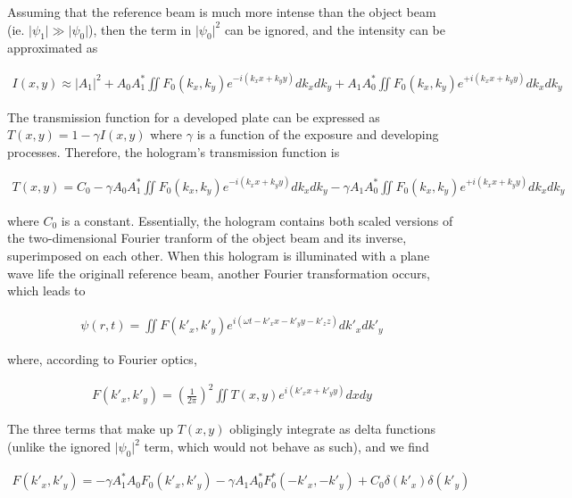 \documentclass[12pt]{article}
\begin{document}
Assuming that the reference beam is much more intense than the object beam (ie. $\lvert \psi_1 \rvert \gg \lvert \psi_0 \rvert$), then the term in $\lvert \psi_0 \rvert^2$ can be ignored,
and the intensity can be approximated as

\vspace{-2ex}
\begin{gather*}
    I (x,y) \approx \lvert A_1 \rvert^2 + A_0 A_1^* \iint F_0 (k_x,k_y) e^{-i(k_xx + k_yy)} dk_x dk_y + A_1 A_0^* \iint F_0 (k_x,k_y) e^{+i(k_xx + k_yy)} dk_x dk_y
\end{gather*}

The transmission function for a developed plate can be expressed as $T(x,y) = 1 - \gamma I(x,y)$ where $\gamma$ is a function of the exposure and
developing processes. Therefore, the hologram's transmission function is

\vspace{-2ex}
\begin{gather*}
    T(x,y) = C_0 - \gamma A_0A_1^* \iint F_0 (k_x,k_y) e^{-i(k_xx+k_yy)} dk_x dk_y - \gamma A_1 A_0^* \iint F_0 (k_x,k_y) e^{+i(k_xx +k_yy)} dk_x dk_y
\end{gather*}

where $C_0$ is a constant. Essentially, the hologram contains both scaled versions of the two-dimensional Fourier tranform of the object beam and its inverse, superimposed on each other.
When this hologram is illuminated with a plane wave life the originall reference beam, another Fourier transformation occurs, which leads to

\vspace{-2ex}
\begin{gather*}
    \psi (r,t) = \iint F(k'_x,k'_y) e^{i(\omega t - k'_xx - k'_yy - k'_zz)} dk'_x dk'_y
\end{gather*}

where, according to Fourier optics,

\vspace{-2ex}
\begin{gather*}
    F(k'_x,k'_y) = \left( \frac{1}{2 \pi} \right)^2 \iint T(x,y) e^{i(k'_xx + k'_yy)} dxdy
\end{gather*}

The three terms that make up $T(x,y)$ obligingly integrate as delta functions (unlike the ignored $\lvert \psi_0 \rvert^2$ term, which would not behave as such), and we find

\vspace{-2ex}
\begin{gather*}
    F(k'_x,k'_y) = - \gamma A_1^* A_0 F_0 (k'_x,k'_y) - \gamma A_1 A_0^* F_0^* (-k'_x, -k'_y) + C_0 \delta (k'_x)\delta(k'_y)
\end{gather*}
\end{document}
